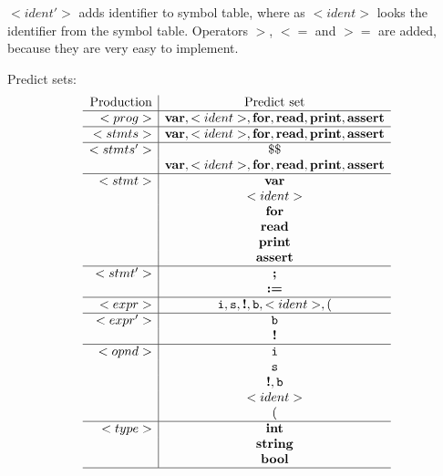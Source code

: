 \documentclass[a4paper,12pt]{article}
\newcommand{\bb}[1]{\textbf{#1}}
\newcommand{\ttt}[1]{\texttt{#1}}
\newcommand{\integer}{\ttt{i}}
\newcommand{\str}{\ttt{s}}
\newcommand{\bool}{\ttt{b}}
\begin{document}
$<ident'>$ adds identifier to symbol table, where as $<ident>$ looks the
identifier from the symbol table. Operators $>$, $<=$ and $>=$ are added,
because they are very easy to implement.

Predict sets:
\[
\begin{array}{r|c}
\text{Production} & \text{Predict set} \\
\hline
<prog>   & \bb{var}, <ident>, \bb{for}, \bb{read}, \bb{print}, \bb{assert} \\
\hline
<stmts>  & \bb{var}, <ident>, \bb{for}, \bb{read}, \bb{print}, \bb{assert} \\
\hline
<stmts'> & \$\$ \\
         & \bb{var}, <ident>, \bb{for}, \bb{read}, \bb{print}, \bb{assert} \\
\hline
<stmt>   & \bb{var}  \\
         & <ident>  \\
         & \bb{for}  \\
         & \bb{read}  \\
         & \bb{print}  \\
         & \bb{assert}  \\
\hline
<stmt'>  & \bb{;} \\
         & \bb{:=}  \\
\hline
<expr>   & \integer, \str, \bb{!}, \bool, <ident>, ( \\
\hline
<expr'>  & \bool \\
         & \bb{!}  \\
\hline
<opnd>   & \integer  \\
         & \str  \\
         & \bb{!}, \bool  \\
         & <ident>  \\
         & (  \\
\hline
<type>   & \bb{int} \\
         & \bb{string} \\
         & \bb{bool} \\
\hline
\end{array}
\]
\end{document}
